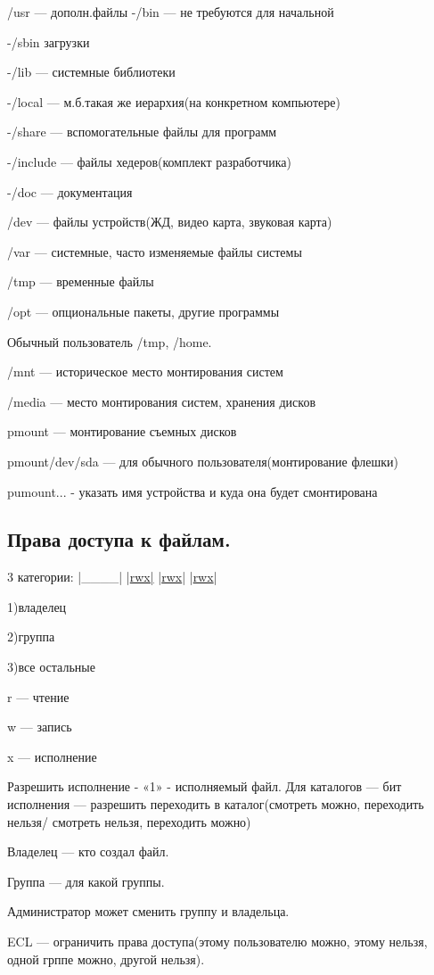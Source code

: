 \par /usr
— дополн.файлы	-/bin — не требуются для
начальной
\par 
				-/sbin    загрузки
\par 
				-/lib — системные библиотеки
\par 
				-/local — м.б.такая же иерархия(на
конкретном компьютере)
\par 
				-/share — вспомогательные файлы для
программ 

\par 
				-/include — файлы хедеров(комплект
разработчика)
\par 
				-/doc — документация 

\par 
/dev — файлы устройств(ЖД, видео карта,
звуковая карта)
\par 
/var — системные, часто изменяемые файлы
системы
\par 
/tmp — временные файлы
\par 
/opt — опциональные пакеты, другие
программы
\par 
Обычный пользователь /tmp, /home.
\par 
/mnt — историческое место монтирования
систем
\par 
/media — место монтирования систем, хранения
дисков
\par 
pmount — монтирование съемных дисков

\par 
pmount/dev/sda — для обычного пользователя(монтирование
флешки)
\par 
pumount... - указать имя устройства и куда
она будет смонтирована

\subsection {Права доступа к файлам.}
\par 3
категории: |\_\_\_\_|
|\underline{rwx|}
|\underline{rwx}|
|\underline{rwx}|
\par 
1)владелец
\par 
2)группа
\par 
3)все остальные

\par 
r — чтение
\par 
w — запись
\par 
x — исполнение 

\par 
Разрешить исполнение - «1» - исполняемый
файл. Для каталогов — бит исполнения —
разрешить переходить в каталог(смотреть
можно, переходить нельзя/ смотреть
нельзя, переходить можно)
\par 
Владелец — кто создал файл.
\par 
Группа — для какой группы.
\par 
Администратор может сменить группу и
владельца.
\par 
ECL — ограничить права доступа(этому
пользователю можно, этому нельзя, одной
грппе можно, другой нельзя).

